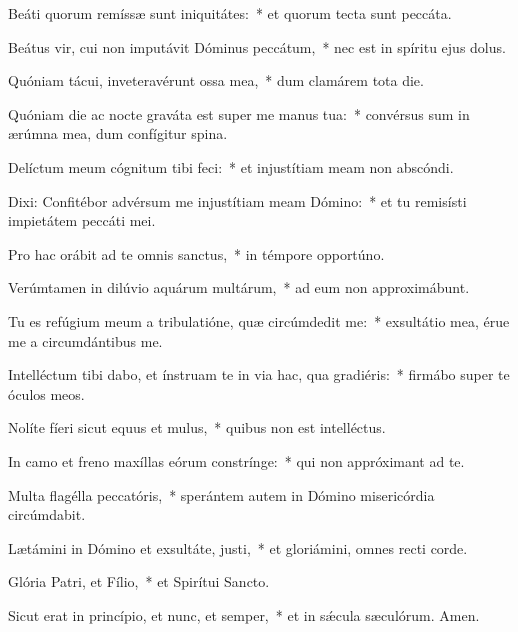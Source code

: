 \item Beáti quorum remíssæ sunt iniquitátes:~* et quorum tecta sunt peccáta.

\item Beátus vir, cui non imputávit Dóminus peccátum,~* nec est in spíritu ejus dolus.

\item Quóniam tácui, inveteravérunt ossa mea,~* dum clamárem tota die.

\item Quóniam die ac nocte graváta est super me manus tua:~* convérsus sum in ærúmna mea, dum confígitur spina.

\item Delíctum meum cógnitum tibi feci:~* et injustítiam meam non abscóndi.

\item Dixi: Confitébor advérsum me injustítiam meam Dómino:~* et tu remisísti impietátem peccáti mei.

\item Pro hac orábit ad te omnis sanctus,~* in témpore opportúno.

\item Verúmtamen in dilúvio aquárum multárum,~* ad eum non approximábunt.

\item Tu es refúgium meum a tribulatióne, quæ circúmdedit me:~* exsultátio mea, érue me a circumdántibus me.

\item Intelléctum tibi dabo, et ínstruam te in via hac, qua gradiéris:~* firmábo super te óculos meos.

\item Nolíte fíeri sicut equus et mulus,~* quibus non est intelléctus.

\item In camo et freno maxíllas eórum constrínge:~* qui non appróximant ad te.

\item Multa flagélla peccatóris,~* sperántem autem in Dómino misericórdia circúmdabit.

\item Lætámini in Dómino et exsultáte, justi,~* et gloriámini, omnes recti corde.

\item Glória Patri, et Fílio,~* et Spirítui Sancto.

\item Sicut erat in princípio, et nunc, et semper,~* et in sǽcula sæculórum. Amen.

